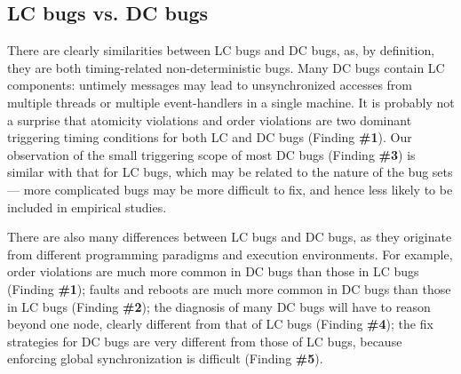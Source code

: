 \subsection{LC bugs vs. DC bugs}
\label{less-lcdc}
There are clearly similarities between LC bugs and DC bugs, as, 
by definition, they are both timing-related non-deterministic bugs.
Many DC bugs contain LC components:
untimely messages may lead to unsynchronized accesses from 
multiple threads or multiple event-handlers 
\cite{vechev.oopsla13,satish.pldi14} in a single machine.
It is probably not a surprise that atomicity violations
and order violations are two dominant triggering timing conditions
for both LC and DC bugs (Finding {\bf \#1}). 
Our observation of the small triggering scope of most DC bugs
(Finding {\bf \#3})
is similar with that for LC bugs, which may be related to the nature
of the bug sets ---
more complicated bugs may be more difficult to fix, and
hence less likely to be included in empirical studies. 

There are also many differences between LC bugs and DC bugs, as they originate
from different programming paradigms and execution
environments. For example, order violations are much more common in DC bugs
than those in LC bugs (Finding {\bf \#1}); faults and reboots are much 
more common in DC bugs than those in LC bugs (Finding {\bf \#2}); 
the diagnosis of many DC bugs will have to reason beyond one node, 
clearly different from that of LC bugs (Finding {\bf \#4});
the fix
strategies for DC bugs are very different from those of LC bugs, because
enforcing global synchronization is difficult (Finding {\bf \#5}).
